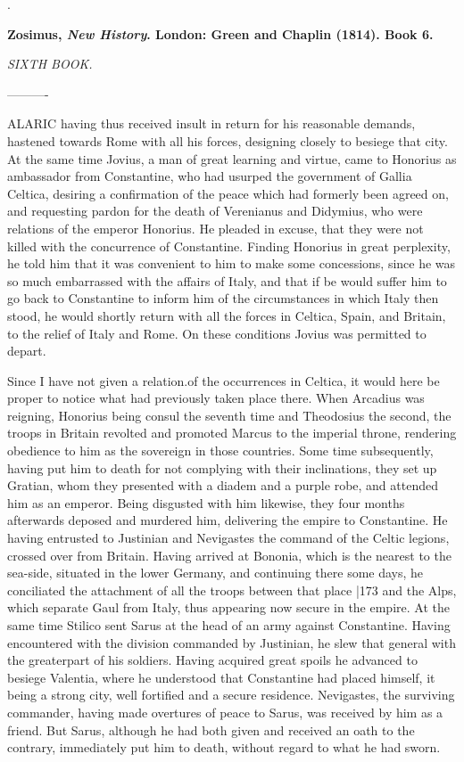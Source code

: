 .


\textbf{Zosimus, \emph{New History}. London: Green and Chaplin
(1814). Book 6.}

\emph{SIXTH BOOK.}

----------

ALARIC having thus received insult in return for his reasonable demands, hastened towards Rome with all his forces, designing closely to besiege that city. At the same time Jovius, a man of great learning and virtue, came to Honorius as ambassador from Constantine, who had usurped the government of Gallia Celtica, desiring a confirmation of the peace which had formerly been agreed on, and requesting pardon for the death of Verenianus and Didymius, who were relations of the emperor Honorius. He pleaded in excuse, that they were not killed with the concurrence of Constantine. Finding Honorius in great perplexity, he told him that it was convenient to him to make some concessions, since he was so much embarrassed with the affairs of Italy, and that if be would suffer him to go back to Constantine to inform him of the circumstances in which Italy then stood, he would shortly return with all the forces in Celtica, Spain, and Britain, to the relief of Italy and Rome. On these conditions Jovius was permitted to depart.

Since I have not given a relation.of the occurrences in Celtica, it would here be proper to notice what had previously taken place there. When Arcadius was reigning, Honorius being consul the seventh time and Theodosius the second, the troops in Britain revolted and promoted Marcus to the imperial throne, rendering obedience to him as the sovereign in those countries. Some time subsequently, having put him to death for not complying with their inclinations, they set up Gratian, whom they presented with a diadem and a purple robe, and attended him as an emperor. Being disgusted with him likewise, they four months afterwards deposed and murdered him, delivering the empire to Constantine. He having entrusted to Justinian and Nevigastes the command of the Celtic legions, crossed over from Britain. Having arrived at Bononia, which is the nearest to the sea-side, situated in the lower Germany, and continuing there some days, he conciliated the attachment of all the troops between that place
|173 and the Alps, which separate Gaul from Italy, thus appearing now secure in the empire. At the same time Stilico sent Sarus at the head of an army against Constantine. Having encountered with the division commanded by Justinian, he slew that general with the greaterpart of his soldiers. Having acquired great spoils he advanced to besiege Valentia, where he understood that Constantine had placed himself, it being a strong city, well fortified and a secure residence. Nevigastes, the surviving commander, having made overtures of peace to Sarus, was received by him as a friend. But Sarus, although he had both given and received an oath to the contrary, immediately put him to death, without regard to what he had sworn.

